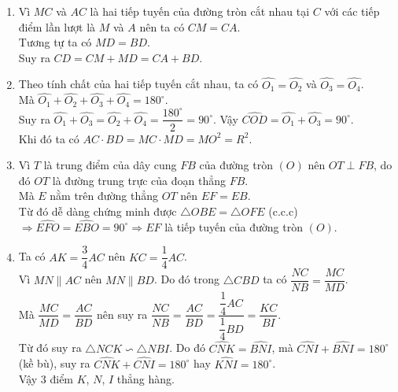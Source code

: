 \begin{ex}
{\begin{center}
		\end{center}
		\begin{enumerate}
			\item Vì $MC$ và $AC$ là hai tiếp tuyến của đường tròn cắt nhau tại $C$ với các tiếp điểm lần lượt là $M$ và $A$ nên ta có $CM=CA$.\\
			Tương tự ta có $MD=BD$.\\
			Suy ra $CD = CM+MD=CA+BD$.
			\item Theo tính chất của hai tiếp tuyến cắt nhau, ta có $\widehat{O_1} = \widehat{O_2}$ và $\widehat{O_3} = \widehat{O_4}$.\\
			Mà $\widehat{O_1}+\widehat{O_2}+\widehat{O_3}+\widehat{O_4} = 180^\circ$.\\
			Suy ra $\widehat{O_1}+\widehat{O_3} = \widehat{O_2}+\widehat{O_4} = \dfrac{180^\circ}{2} = 90^\circ$. Vậy $\widehat{COD} = \widehat{O_1}+\widehat{O_3} = 90^\circ$.\\
			Khi đó ta có $AC \cdot BD = MC \cdot MD = MO^2 = R^2$.
			\item Vì $T$ là trung điểm của dây cung $FB$ của đường tròn $(O)$ nên $OT \perp FB$, do đó $OT$ là đường trung trực của đoạn thẳng $FB$.\\
			Mà $E$ nằm trên đường thẳng $OT$ nên $EF=EB$.\\
			Từ đó dễ dàng chứng minh được $\triangle OBE = \triangle OFE$ (c.c.c) $\Rightarrow \widehat{EFO} = \widehat{EBO} = 90^\circ \Rightarrow EF$ là tiếp tuyến của đường tròn $(O)$.
			\item Ta có $AK = \dfrac{3}{4}AC$ nên $KC = \dfrac{1}{4}AC$.\\
			Vì $MN \parallel AC$ nên $MN \parallel BD$. Do đó trong $\triangle CBD$ ta có $\dfrac{NC}{NB} = \dfrac{MC}{MD}$.\\ 
			Mà $\dfrac{MC}{MD} = \dfrac{AC}{BD}$ nên suy ra $\dfrac{NC}{NB} = \dfrac{AC}{BD} = \dfrac{\dfrac{1}{4}AC}{\dfrac{1}{4}BD}=\dfrac{KC}{BI}$.\\
			Từ đó suy ra $\triangle NCK \backsim \triangle NBI$. Do đó $\widehat{CNK} = \widehat{BNI}$, mà $\widehat{CNI}+\widehat{BNI} = 180^\circ$ (kề bù), suy ra $\widehat{CNK}+\widehat{CNI} = 180^\circ$ hay $\widehat{KNI} = 180^\circ$.\\
			Vậy $3$ điểm $K$, $N$, $I$ thẳng hàng.
		\end{enumerate}
	}
\end{ex}

